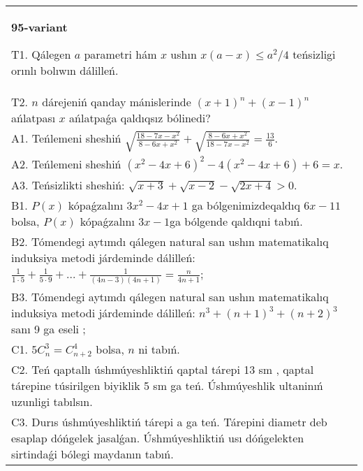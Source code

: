 \documentclass{article}
\begin{document}
\begin{tabular}{m{17cm}}
\textbf{95-variant}
\newline

T1. Qálegen \(a\) parametri hám \(x\) ushın \(x(a - x) \leq a^{2}/4\) teńsizligi orınlı bolıwın dálilleń. \\
T2. \(n\) dárejeniń qanday mánislerinde \((x + 1)^{n} + (x - 1)^{n}\) ańlatpası \(x\) ańlatpaǵa qaldıqsız bólinedi? \\
A1. Teńlemeni sheshiń \(\sqrt{\frac{18 - 7x - x^{2}}{8 - 6x + x^{2}}} + \sqrt{\frac{8 - 6x + x^{2}}{18 - 7x - x^{2}}} = \frac{13}{6}\). \\
A2. Teńlemeni sheshiń \(\left( x^{2} - 4x + 6 \right)^{2} - 4\left( x^{2} - 4x + 6 \right) + 6 = x\). \\
A3. Teńsizlikti sheshiń: \(\sqrt{x + 3} + \sqrt{x - 2} - \sqrt{2x + 4} > 0\). \\
B1. \(P(x)\) kópaǵzalını \(3x^{2} - 4x + 1\) ga bólgenimizdeqaldıq \(6x - 11\) bolsa, \(P(x)\) kópaǵzalını \(3x - 1\)ga bólgende qaldıqni tabıń. \\
B2. Tómendegi aytımdı qálegen natural san ushın matematikalıq induksiya metodi járdeminde dálilleń: \(\frac{1}{1 \cdot 5} + \frac{1}{5 \cdot 9} + ... + \frac{1}{(4n - 3)(4n + 1)} = \frac{n}{4n + 1}\); \\
B3. Tómendegi aytımdı qálegen natural san ushın matematikalıq induksiya metodi járdeminde dálilleń: \(n^{3} + (n + 1)^{3} + (n + 2)^{3}\) sanı 9 ga eseli ; \\
C1. \(5C_{n}^{3} = C_{n + 2}^{4}\) bolsa, \(n\) ni tabıń. \\
C2. Teń qaptallı úshmúyeshliktiń qaptal tárepi 13 sm , qaptal tárepine túsirilgen biyiklik 5 sm ga teń. Úshmúyeshlik ultaninıń uzunligi tabılsın. \\
C3. Durıs úshmúyeshliktiń tárepi a ga teń. Tárepini diametr deb esaplap dóńgelek jasalǵan. Úshmúyeshliktiń usı dóńgelekten sirtindaǵi bólegi maydanın tabıń. \\

\end{tabular}
\vspace{1cm}
\end{document}
